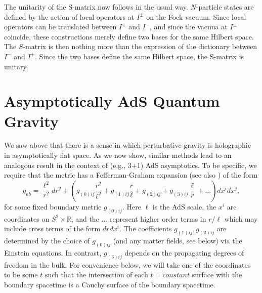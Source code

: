 \documentclass[12pt,onecolumn,eqsecnum,aps,prd,nofootinbib]{revtex4}
\def\be{\begin{equation}}
\def\ee{\end{equation}}
\begin{document}
The unitarity of the S-matrix now follows in the usual way.
$N$-particle states are defined by the action of local operators at
$I^\pm$ on the Fock vacuum.  Since local operators can be translated between $I^+$
and $I^-$, and since the vacuua at $I^\pm$ coincide, these constructions merely define two bases for the same
Hilbert space.  The $S$-matrix is then nothing more than the expression of the dictionary between $I^-$ and $I^+$. Since the two bases define the same Hilbert space, the S-matrix is unitary.

\section{Asymptotically AdS Quantum Gravity}
\label{AdS}

We saw above that there is a sense in which perturbative gravity is
holographic in asymptotically flat space.  As we now show, similar
methods lead to an analogous result in the context of (e.g., 3+1)
AdS asymptotics.  To be specific, we require that the metric has a
Fefferman-Graham expansion \cite{FG} (see also \cite{HS}) of the
form
 \be
 g_{ab} = \frac{\ell^2}{r^2}dr^2 + \left( g_{(0)ij} \frac{r^2}{\ell^2} + g_{(1)ij} \frac{r}{\ell} + g_{(2)ij} + g_{(3)ij} \frac{\ell}{r}
  + \dots \right) dx^i dx^j,
 \ee
for some fixed boundary metric $g_{(0)ij}$. Here $\ell$ is the AdS
scale, the $x^i$ are coordinates on $S^2 \times {\mathbb R}$, and
the $\dots$ represent higher order terms in $r/\ell$ which may
include cross terms of the form $dr dx^i$.
 The coefficients
$g_{(1)ij},g_{(2)ij}$ are determined by the choice of $g_{(0)ij}$
(and any matter fields, see below) via the Einstein equations. In
contrast, $g_{(3)ij}$ depends on the propagating degrees of freedom
in the bulk. For convenience below, we will take one of the coordinates to be some $t$ such that the intersection of each $t=constant$ surface with the boundary spacetime is a Cauchy surface of the boundary spacetime.
\end{document}
